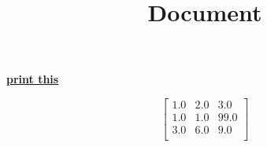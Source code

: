 \documentclass[]{article}
\title{Document}
\begin{document}
\textbf{\underline{print this}}

\[\begin{bmatrix}
1.0 & 2.0 & 3.0\\
1.0 & 1.0 & 99.0\\
3.0 & 6.0 & 9.0\\
\end{bmatrix}\]
\end{document}
